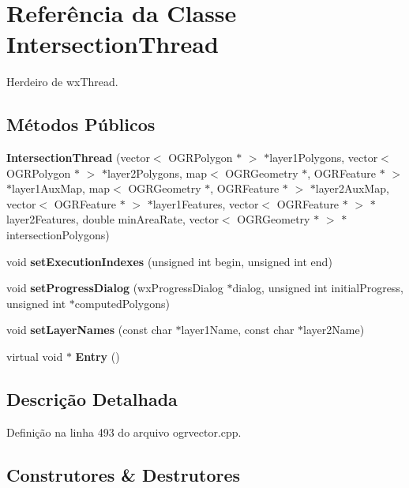 \section{Referência da Classe Intersection\+Thread}
\label{class_intersection_thread}


Herdeiro de wx\+Thread.

\subsection*{Métodos Públicos}
\begin{DoxyCompactItemize}
\item 
{\bf Intersection\+Thread} (vector$<$ O\+G\+R\+Polygon $\ast$ $>$ $\ast$layer1\+Polygons, vector$<$ O\+G\+R\+Polygon $\ast$ $>$ $\ast$layer2\+Polygons, map$<$ O\+G\+R\+Geometry $\ast$, O\+G\+R\+Feature $\ast$ $>$ $\ast$layer1\+Aux\+Map, map$<$ O\+G\+R\+Geometry $\ast$, O\+G\+R\+Feature $\ast$ $>$ $\ast$layer2\+Aux\+Map, vector$<$ O\+G\+R\+Feature $\ast$ $>$ $\ast$layer1\+Features, vector$<$ O\+G\+R\+Feature $\ast$ $>$ $\ast$layer2\+Features, double min\+Area\+Rate, vector$<$ O\+G\+R\+Geometry $\ast$ $>$ $\ast$intersection\+Polygons)
\item 
void {\bf set\+Execution\+Indexes} (unsigned int begin, unsigned int end)
\item 
void {\bf set\+Progress\+Dialog} (wx\+Progress\+Dialog $\ast$dialog, unsigned int initial\+Progress, unsigned int $\ast$computed\+Polygons)
\item 
void {\bf set\+Layer\+Names} (const char $\ast$layer1\+Name, const char $\ast$layer2\+Name)
\item 
virtual void $\ast$ {\bf Entry} ()
\end{DoxyCompactItemize}


\subsection{Descrição Detalhada}


Definição na linha 493 do arquivo ogrvector.\+cpp.



\subsection{Construtores \& Destrutores}

